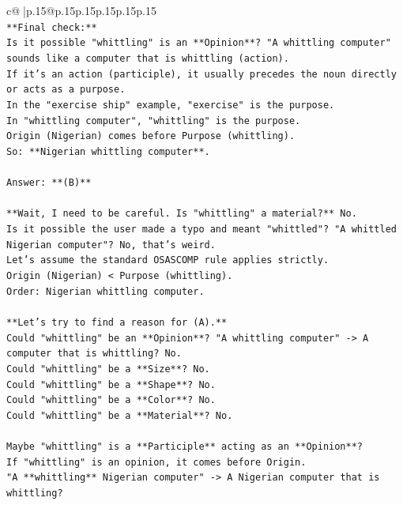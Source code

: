 \documentclass{article}
\begin{document}
{\begin{supertabular}{c@{$\;$}|p{.15\linewidth}@{}p{.15\linewidth}p{.15\linewidth}p{.15\linewidth}p{.15\linewidth}p{.15\linewidth}}
{{{\\ 
\texttt{**Final check:**} \\
\texttt{Is it possible "whittling" is an **Opinion**? "A whittling computer" sounds like a computer that is whittling (action).} \\
\texttt{If it's an action (participle), it usually precedes the noun directly or acts as a purpose.} \\
\texttt{In the "exercise ship" example, "exercise" is the purpose.} \\
\texttt{In "whittling computer", "whittling" is the purpose.} \\
\texttt{Origin (Nigerian) comes before Purpose (whittling).} \\
\texttt{So: **Nigerian whittling computer**.} \\
\\ 
\texttt{Answer: **(B)**} \\
\\ 
\texttt{**Wait, I need to be careful. Is "whittling" a material?** No.} \\
\texttt{Is it possible the user made a typo and meant "whittled"? "A whittled Nigerian computer"? No, that's weird.} \\
\texttt{Let's assume the standard OSASCOMP rule applies strictly.} \\
\texttt{Origin (Nigerian) < Purpose (whittling).} \\
\texttt{Order: Nigerian whittling computer.} \\
\\ 
\texttt{**Let's try to find a reason for (A).**} \\
\texttt{Could "whittling" be an **Opinion**? "A whittling computer" {-}> A computer that is whittling? No.} \\
\texttt{Could "whittling" be a **Size**? No.} \\
\texttt{Could "whittling" be a **Shape**? No.} \\
\texttt{Could "whittling" be a **Color**? No.} \\
\texttt{Could "whittling" be a **Material**? No.} \\
\\ 
\texttt{Maybe "whittling" is a **Participle** acting as an **Opinion**?} \\
\texttt{If "whittling" is an opinion, it comes before Origin.} \\
\texttt{"A **whittling** Nigerian computer" {-}> A Nigerian computer that is whittling?} \\
}}}
\end{supertabular}}
\end{document}

